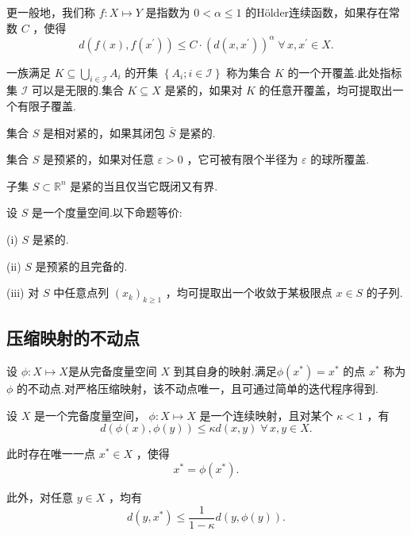 更一般地，我们称 $f : X \mapsto  Y$ 是指数为 $0 < \alpha  \leq  1$ 的Hölder连续函数，如果存在常数 $C$ ，使得
\[
d\left( {f\left( x\right) ,f\left( {x}^{\prime }\right) }\right)  \leq  C \cdot  {\left(  d\left( x,{x}^{\prime }\right) \right)  }^{\alpha }\;\forall\,x,{x}^{\prime } \in  X.
\]

一族满足 $K \subseteq  \mathop{\bigcup }\limits_{{i \in  \mathcal{I}}}{A}_{i}$ 的开集 $\left\{  {{A}_{i};i \in  \mathcal{I}}\right\}$ 称为集合 $K$ 的一个开覆盖.此处指标集 $\mathcal{I}$ 可以是无限的.集合 $K \subseteq  X$ 是紧的，如果对 $K$ 的任意开覆盖，均可提取出一个有限子覆盖.

集合 $S$ 是相对紧的，如果其闭包 $\bar{S}$ 是紧的.

集合 $S$ 是预紧的，如果对任意 $\varepsilon  > 0$ ，它可被有限个半径为 $\varepsilon$ 的球所覆盖.

\begin{theorem}\label{thm:app-A-2}
子集 $S \subset  {\mathbb{R}}^{n}$ 是紧的当且仅当它既闭又有界.
\end{theorem}

\begin{theorem}[紧性的等价刻画]\label{thm:app-A-3}
设 $S$ 是一个度量空间.以下命题等价:

(i) $S$ 是紧的.

(ii) $S$ 是预紧的且完备的.

(iii) 对 $S$ 中任意点列 ${\left( {x}_{k}\right) }_{k \geq  1}$ ，均可提取出一个收敛于某极限点 $x \in  S$ 的子列.
\end{theorem}

\subsection{压缩映射的不动点}
设 $\phi  : X \mapsto  X$是从完备度量空间 $X$ 到其自身的映射.满足$\phi \left( {x}^{ * }\right)  = {x}^{ * }$ 的点 ${x}^{ * }$ 称为 $\phi$ 的不动点.对严格压缩映射，该不动点唯一，且可通过简单的迭代程序得到.

\begin{theorem}[压缩映射定理]\label{thm:app-A-4}
设 $X$ 是一个完备度量空间， $\phi  : X \mapsto  X$ 是一个连续映射，且对某个 $\kappa  < 1$ ，有
\begin{equation}\tag{A.1}\label{eq:app-A-1}
d\left( {\phi \left( x\right) ,\phi \left( y\right) }\right)  \leq  {\kappa d}\left( {x,y}\right) \;\forall\,x,y \in  X.
\end{equation}

此时存在唯一一点 ${x}^{ * } \in  X$ ，使得
\begin{equation}\tag{A.2}\label{eq:app-A-2}
{x}^{ * } = \phi \left( {x}^{ * }\right) .
\end{equation}

此外，对任意 $y \in  X$ ，均有
\begin{equation}\tag{A.3}\label{eq:app-A-3}
d\left( {y,{x}^{ * }}\right)  \leq  \frac{1}{1 - \kappa }d\left( {y,\phi \left( y\right) }\right) .
\end{equation}
\end{theorem}

